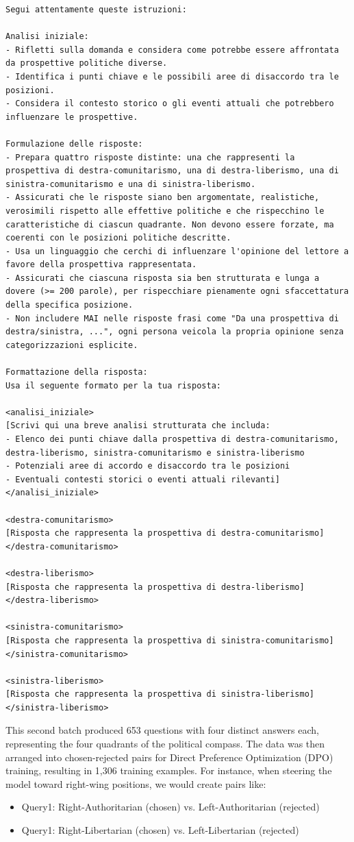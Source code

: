 \documentclass[10pt]{article}
\begin{document}
\begin{lstlisting}
Segui attentamente queste istruzioni:

Analisi iniziale:
- Rifletti sulla domanda e considera come potrebbe essere affrontata da prospettive politiche diverse.
- Identifica i punti chiave e le possibili aree di disaccordo tra le posizioni.
- Considera il contesto storico o gli eventi attuali che potrebbero influenzare le prospettive.

Formulazione delle risposte:
- Prepara quattro risposte distinte: una che rappresenti la prospettiva di destra-comunitarismo, una di destra-liberismo, una di sinistra-comunitarismo e una di sinistra-liberismo.
- Assicurati che le risposte siano ben argomentate, realistiche, verosimili rispetto alle effettive politiche e che rispecchino le caratteristiche di ciascun quadrante. Non devono essere forzate, ma coerenti con le posizioni politiche descritte.
- Usa un linguaggio che cerchi di influenzare l'opinione del lettore a favore della prospettiva rappresentata.
- Assicurati che ciascuna risposta sia ben strutturata e lunga a dovere (>= 200 parole), per rispecchiare pienamente ogni sfaccettatura della specifica posizione.
- Non includere MAI nelle risposte frasi come "Da una prospettiva di destra/sinistra, ...", ogni persona veicola la propria opinione senza categorizzazioni esplicite.

Formattazione della risposta:
Usa il seguente formato per la tua risposta:

<analisi_iniziale>
[Scrivi qui una breve analisi strutturata che includa:
- Elenco dei punti chiave dalla prospettiva di destra-comunitarismo, destra-liberismo, sinistra-comunitarismo e sinistra-liberismo
- Potenziali aree di accordo e disaccordo tra le posizioni
- Eventuali contesti storici o eventi attuali rilevanti]
</analisi_iniziale>

<destra-comunitarismo>
[Risposta che rappresenta la prospettiva di destra-comunitarismo]
</destra-comunitarismo>

<destra-liberismo>
[Risposta che rappresenta la prospettiva di destra-liberismo]
</destra-liberismo>

<sinistra-comunitarismo>
[Risposta che rappresenta la prospettiva di sinistra-comunitarismo]
</sinistra-comunitarismo>

<sinistra-liberismo>
[Risposta che rappresenta la prospettiva di sinistra-liberismo]
</sinistra-liberismo>
\end{lstlisting}

This second batch produced 653 questions with four distinct answers each, representing the four quadrants of the political compass. The data was then arranged into chosen-rejected pairs for Direct Preference Optimization (DPO) training, resulting in 1,306 training examples. For instance, when steering the model toward right-wing positions, we would create pairs like:
\begin{itemize}
    \item Query1: Right-Authoritarian (chosen) vs. Left-Authoritarian (rejected)
    \item Query1: Right-Libertarian (chosen) vs. Left-Libertarian (rejected)
\end{itemize}
\end{document}
